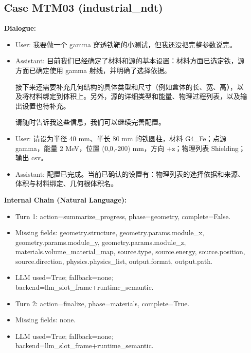 \documentclass[11pt]{ctexart}
\begin{document}
\subsection{Case MTM03 (industrial\_ndt)}
\textbf{Dialogue:}
\begin{itemize}
\item User: 我要做一个 gamma 穿透铁靶的小测试，但我还没把完整参数说完。
\item Assistant: 目前我们已经确定了材料和源的基本设置：材料方面已选定铁，源方面已确定使用 gamma 射线，并明确了选择依据。

接下来还需要补充几何结构的具体类型和尺寸（例如盒体的长、宽、高），以及将材料绑定到体积上。另外，源的详细类型和能量、物理过程列表，以及输出设置也待补充。

请随时告诉我这些信息，我们可以继续完善配置。
\item User: 请设为半径 40 mm、半长 80 mm 的铁圆柱，材料 G4\_Fe；点源 gamma，能量 2 MeV，位置 (0,0,-200) mm，方向 +z；物理列表 Shielding；输出 csv。
\item Assistant: 配置已完成。当前已确认的设置有：物理列表的选择依据和来源、体积与材料绑定、几何根体积名。
\end{itemize}
\textbf{Internal Chain (Natural Language):}
\begin{itemize}
\item Turn 1: action=summarize\_progress, phase=geometry, complete=False.
\item Missing fields: geometry.structure, geometry.params.module\_x, geometry.params.module\_y, geometry.params.module\_z, materials.volume\_material\_map, source.type, source.energy, source.position, source.direction, physics.physics\_list, output.format, output.path.
\item LLM used=True; fallback=none; backend=llm\_slot\_frame+runtime\_semantic.
\item Turn 2: action=finalize, phase=materials, complete=True.
\item Missing fields: none.
\item LLM used=True; fallback=none; backend=llm\_slot\_frame+runtime\_semantic.
\end{itemize}
\end{document}
